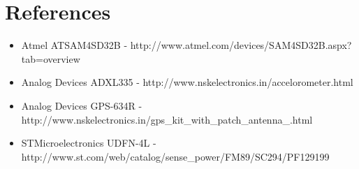 \documentclass[a4paper, twoside]{article}
\begin{document}
\section{References}
\begin{itemize}
\item{Atmel ATSAM4SD32B -
	http://www.atmel.com/devices/SAM4SD32B.aspx?tab=overview}
\item{Analog Devices ADXL335 - http://www.nskelectronics.in/accelorometer.html}
\item{Analog Devices GPS-634R -
	http://www.nskelectronics.in/gps\_kit\_with\_patch\_antenna\_.html}
\item{STMicroelectronics UDFN-4L - http://www.st.com/web/catalog/sense\_power/FM89/SC294/PF129199}
\end{itemize}
\end{document}
